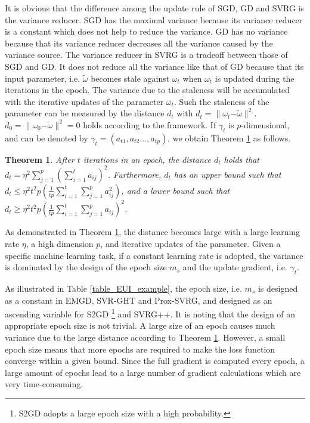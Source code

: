 \documentclass[letterpaper]{article}
\begin{document}
It is obvious that the difference among the update rule of SGD, GD and SVRG is the variance reducer. SGD has the maximal variance because its variance reducer  is a constant which does not help to reduce the variance. GD has no variance because that its variance reducer decreases all the variance caused by the variance source. The variance reducer in SVRG is a tradeoff  between those of SGD and GD. It does not reduce all the variance like that of GD because that its input parameter, i.e. $\tilde{\omega}$ becomes stale against $\omega_{t}$  when   $\omega_{t}$  is updated during the iterations in the epoch. The variance due to the staleness will be accumulated with the iterative updates of the parameter $\omega_{t}$.   Such the staleness of the parameter can be measured by  the distance $d_t$ with $d_t = \parallel \omega_{t} \mathrm{-} \tilde{\omega} \parallel^2$. $d_0 = \parallel \omega_{0}\mathrm{-}\tilde{\omega}\parallel^2 = 0$ holds according to the framework. If $\gamma_t$ is $p$-dimensional, and can be denoted by  $\gamma_t = (a_{t1}, a_{t2}..., a_{tp})$, we obtain Theorem \ref{theorem_vr_lower_bound}  as follows.


\newtheorem{Theorem}{\bf{Theorem}}
\newtheorem{Corollary}{\bf{Corollary}}
\newtheorem{Lemma}{\bf{Lemma}}
\newtheorem{Assumption}{\bf{Assumption}}


\begin{Theorem}
\label{theorem_vr_lower_bound}
   After $t$ iterations in an epoch, the distance $d_t$ holds that $d_t \mathrm{=} \eta^2 \sum\limits_{j=1}^p\left(  \sum\limits_{i=1}^t a_{ij}  \right)^2$. Furthermore, $d_t$ has an upper bound such that 
   $d_t \mathrm{\le} \eta^2 t^2p  \left( \frac{1}{tp}\sum\limits_{i=1}^t   \sum\limits_{j=1}^p   a_{ij}^2 \right)$, and a lower bound such that $d_t  \mathrm{\ge} \eta^2t^2p \left(\frac{1}{tp}\sum\limits_{i=1}^t   \sum\limits_{j=1}^p   a_{ij}\right)^2$.
\end{Theorem}


As demonstrated in Theorem \ref{theorem_vr_lower_bound}, the distance becomes large with a large learning rate $\eta$, a high dimension $p$, and iterative updates of the parameter. Given a specific machine learning task, if a constant learning rate is adopted, the variance is dominated by the  design of the epoch size $m_s$ and the update gradient, i.e.  $\gamma_t$.  

 As illustrated in Table \ref{table_EUI_example}, the epoch size, i.e. $m_s$ is designed as a constant in EMGD, SVR-GHT and Prox-SVRG, and designed as an ascending variable for  S2GD \footnote{S2GD adopts a large epoch size with a high probability.} and SVRG++.  It is noting that the design of an appropriate epoch size is not trivial. A large size of an epoch causes much variance due to the large distance according to Theorem \ref{theorem_vr_lower_bound}. However, a small epoch size means that more epochs are required to make the loss function converge within a given bound. Since the full gradient is  computed every epoch, a large amount of epochs  lead to a large number of gradient calculations which are very time-consuming.  
\end{document}

